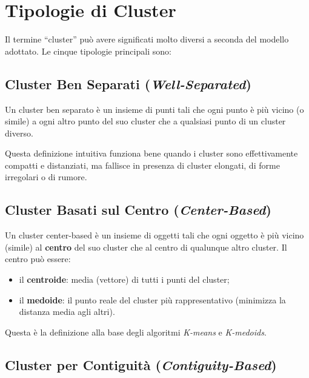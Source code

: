 \section{Tipologie di Cluster}
\label{sec:cluster-definitions}

Il termine ``cluster'' può avere significati molto diversi a seconda del modello adottato. Le cinque tipologie principali sono:

\subsection{Cluster Ben Separati (\textit{Well-Separated})}

\begin{definition}
Un cluster ben separato è un insieme di punti tali che ogni punto è più vicino (o simile) a ogni altro punto del suo cluster che a qualsiasi punto di un cluster diverso.
\end{definition}

Questa definizione intuitiva funziona bene quando i cluster sono effettivamente compatti e distanziati, ma fallisce in presenza di cluster elongati, di forme irregolari o di rumore.

\subsection{Cluster Basati sul Centro (\textit{Center-Based})}

\begin{definition}
Un cluster center-based è un insieme di oggetti tali che ogni oggetto è più vicino (simile) al \textbf{centro} del suo cluster che al centro di qualunque altro cluster. Il centro può essere:
\begin{itemize}
  \item il \textbf{centroide}: media (vettore) di tutti i punti del cluster;
  \item il \textbf{medoide}: il punto reale del cluster più rappresentativo (minimizza la distanza media agli altri).
\end{itemize}
\end{definition}

Questa è la definizione alla base degli algoritmi \textit{K-means} e \textit{K-medoids}.

\subsection{Cluster per Contiguità (\textit{Contiguity-Based})}

